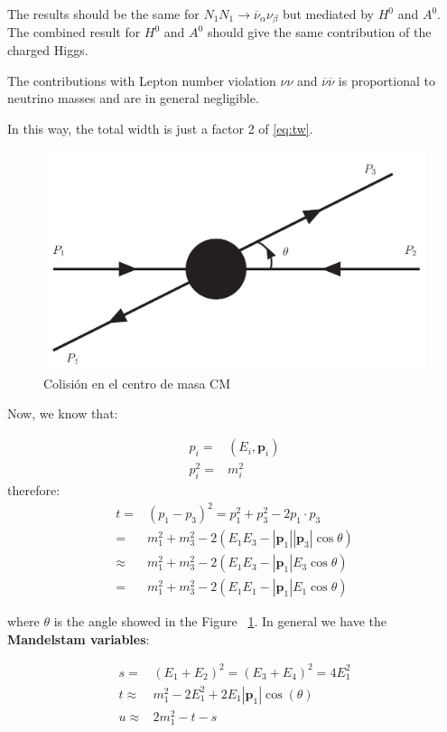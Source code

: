 \documentclass[12pt,letterpaper]{article}
\begin{document}
The results should be the same for $N_1 N_1 \to \overline{\nu}_\alpha \nu_\beta$ but mediated by $H^0$ and $A^0$.
The combined result for $H^0$ and $A^0$ should give the same contribution of the charged Higgs.

The contributions with Lepton number violation $\nu\nu$ and
$\overline{\nu}\overline{\nu}$ is proportional to neutrino masses and
are in general negligible.

In this way, the total width is just a factor 2 of \eqref{eq:tw}.

\begin{figure}
  \centering
  \includegraphics[scale=0.3]{angulo.png}
  \caption{Colisión en el centro de masa CM}
  \label{fig:g}
\end{figure}

Now, we know that:

\begin{align*}
  p_i=&(E_i,\mathbf{p}_i)\\
  p_i^2=&m_i^2
\end{align*}
therefore:
\begin{align}
  t=&(p_1-p_3)^2  = p_1^2+p_3^2-2p_1\cdot p_3\nonumber\\
=& m_1^2+m_3^2-2(E_1 E_3-|\mathbf{p}_1||\mathbf{p}_3|\cos\theta)\nonumber\\
\approx & m_1^2+m_3^2-2(E_1 E_3-|\mathbf{p}_1|E_3\cos\theta)\nonumber\\
=& m_1^2+m_3^2-2(E_1 E_1-|\mathbf{p}_1|E_1\cos\theta)
\end{align}

where $\theta$ is the angle showed in the Figure ~\ref{fig:g}. In general we have the \textbf{Mandelstam variables}:

\begin{align}
\label{eq:mandelstam}
  s=& \left(E_1+E_2\right)^2=\left(E_3+E_4\right)^2=4E_1^2\nonumber\\
t\approx &  m_1^2-2E_1^2+2E_1|\mathbf{p}_1|\cos(\theta)\nonumber\\
u\approx & 2m_1^2 -t -s
\end{align}
\end{document}
